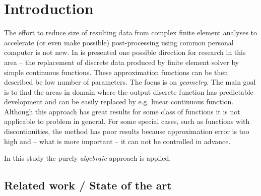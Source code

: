 \section{Introduction}
\label{sec:introduction}


The effort to reduce size of resulting data from complex finite element analyses to accelerate (or even make possible) post-processing using common personal computer is not new.
In \cite{Benes2016} is presented one possible direction for research in this area -- the replacement of discrete data produced by finite element solver by simple continuous functions. These approximation functions can be then described be low number of parameters. The focus is on \textit{geometry}. The main goal is to find the areas in domain where the output discrete function has predictable development and can be easily replaced by e.g. linear continuous function. Although this approach has great results for some class of functions it is not applicable to problem in general. For some special cases, such as functions with discontinuities, the method has poor results because approximation error is too high and -- what is more important -- it can not be controlled in advance.

In this study the purely \textit{algebraic} approach is applied.


\subsection{Related work / State of the art}

